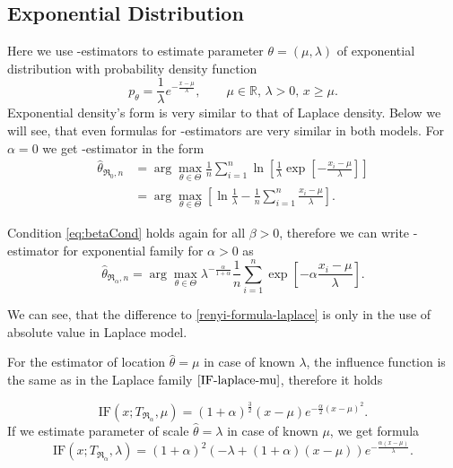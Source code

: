 \subsection{Exponential Distribution} 
Here we use \mRa-estimators to estimate parameter $\theta = (\mu,\lambda)$ of exponential distribution with probability density function 
\begin{equation}
	p_\theta = \frac{1}{\lambda} e^{-\frac{x-\mu}{\lambda}}, \qquad \mu\in \mathbb{R},\, \lambda>0, \, x\geq\mu.
\end{equation}
\noindent Exponential density's form is very similar to that of Laplace density. Below we will see, that even formulas for \mRa-estimators are very similar in both models. For $\alpha = 0$ we get \mRa-estimator in the form
\begin{align}
	\hat{\theta}_{\mathfrak{R}_0,n} & =  \arg \max_{\theta \in \Theta} \frac{1}{n} \sum^n_{i=1} \ln \left[ \frac{1}{\lambda}\exp \left[-\frac{x_i-\mu}{\lambda} \right] \right] \nonumber \\
	& =  \arg \max_{\theta \in \Theta} \left[ \ln \frac{1}{\lambda} - \frac{1}{n} \sum^n_{i=1} \frac{x_i-\mu}{\lambda} \right].
\end{align}

\noindent Condition \ref{eq:betaCond} holds again for all  $\beta>0$, therefore we can write \mRa-estimator for exponential family for $\alpha>0$ as
\begin{equation}
	\hat{\theta}_{\mathfrak{R}_\alpha,n} = \arg \max_{\theta \in \Theta} \lambda^{-\frac{\alpha}{1+\alpha}} \frac{1}{n}\sum_{i=1}^n \exp \left[-\alpha\frac{x_i-\mu}{\lambda} \right].
	\label{renyi-formula-exponential}
\end{equation}

We can see, that the difference to \eqref{renyi-formula-laplace} is only in the use of absolute value in Laplace model.

For  the estimator of location $\hat{\theta} = \mu$ in case of known $\lambda$, the influence function is the same as in the Laplace family $\eqref{IF-laplace-mu}$, therefore it holds

\begin{equation}
	\mathrm{IF}(x;T_{\mathfrak{R}_\alpha},\mu) = (1+\alpha )^{\frac{3}{2}} (x-\mu )  e^{-\frac{\alpha}{2} (x-\mu )^2}. %
	\label{IF-exponential-mu}
\end{equation}
If we estimate parameter of scale $\hat{\theta} = \lambda$ in case of known $ \mu $, we get formula
\begin{equation}
	\mathrm{IF}(x;T_{\mathfrak{R}_\alpha},\lambda) =	(1+\alpha )^2 \left( - \lambda +(1+ \alpha)(x-\mu)\right) e^{-\frac{\alpha (x-\mu)}{\lambda }}. %
	\label{IF-exponential-lambda}
\end{equation}

